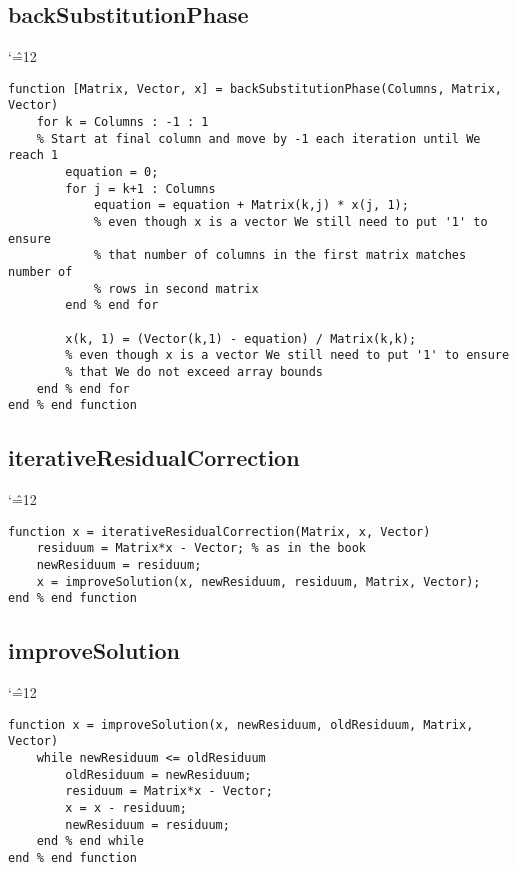 \documentclass{report}
\newenvironment{simplechar}{%
   \catcode`\^=12
}{}
\begin{document}
\subsection{backSubstitutionPhase}
\begin{simplechar}
\begin{lstlisting}
function [Matrix, Vector, x] = backSubstitutionPhase(Columns, Matrix, Vector)
    for k = Columns : -1 : 1
    % Start at final column and move by -1 each iteration until We reach 1
        equation = 0;
        for j = k+1 : Columns
            equation = equation + Matrix(k,j) * x(j, 1);
            % even though x is a vector We still need to put '1' to ensure
            % that number of columns in the first matrix matches number of
            % rows in second matrix
        end % end for

        x(k, 1) = (Vector(k,1) - equation) / Matrix(k,k);
        % even though x is a vector We still need to put '1' to ensure
        % that We do not exceed array bounds
    end % end for
end % end function
\end{lstlisting}
\end{simplechar}

\subsection{iterativeResidualCorrection}
\begin{simplechar}
\begin{lstlisting}
function x = iterativeResidualCorrection(Matrix, x, Vector)
    residuum = Matrix*x - Vector; % as in the book
    newResiduum = residuum;
    x = improveSolution(x, newResiduum, residuum, Matrix, Vector);
end % end function
\end{lstlisting}
\end{simplechar}

\subsection{improveSolution}
\begin{simplechar}
\begin{lstlisting}
function x = improveSolution(x, newResiduum, oldResiduum, Matrix, Vector)
    while newResiduum <= oldResiduum
        oldResiduum = newResiduum;
        residuum = Matrix*x - Vector;
        x = x - residuum;
        newResiduum = residuum;
    end % end while
end % end function
\end{lstlisting}
\end{simplechar}
\end{document}
